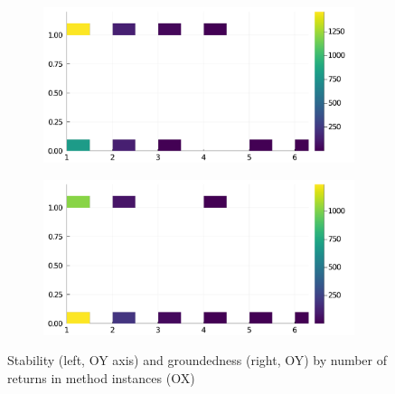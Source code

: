 \begin{figure}[h]
     \begin{subfigure}[b]{0.49\textwidth}
       \includegraphics[width=\textwidth]{figs/all-package-graphs/Gen-returns-vs-stable.pdf}
     \end{subfigure}
     \begin{subfigure}[b]{0.49\textwidth}
       \includegraphics[width=\textwidth]{figs/all-package-graphs/Gen-returns-vs-grounded.pdf}
     \end{subfigure}
\caption{Stability (left, OY axis) and groundedness (right, OY) by number of returns in method instances (OX)}%
%
\label{figs:returns:Gen}
\end{figure}
\clearpage
